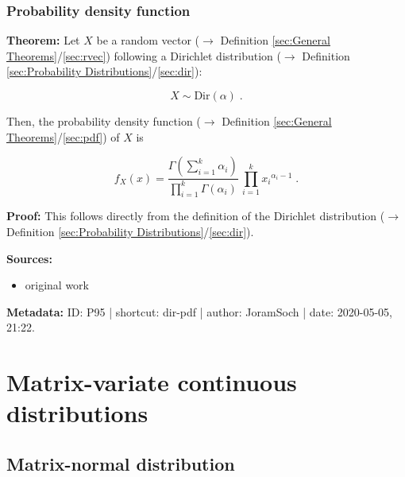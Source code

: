 \documentclass[a4paper,12pt,twoside]{book}
\begin{document}
\subsubsection[\textbf{Probability density function}]{Probability density function} \label{sec:dir-pdf}
\setcounter{equation}{0}

\textbf{Theorem:} Let $X$ be a random vector ($\rightarrow$ Definition \ref{sec:General Theorems}/\ref{sec:rvec}) following a Dirichlet distribution ($\rightarrow$ Definition \ref{sec:Probability Distributions}/\ref{sec:dir}):

\begin{equation} \label{eq:dir-pdf-Dir}
X \sim \mathrm{Dir}(\alpha) \; .
\end{equation}

Then, the probability density function ($\rightarrow$ Definition \ref{sec:General Theorems}/\ref{sec:pdf}) of $X$ is

\begin{equation} \label{eq:dir-pdf-Dir-pdf}
f_X(x) = \frac{\Gamma\left( \sum_{i=1}^k \alpha_i \right)}{\prod_{i=1}^k \Gamma(\alpha_i)} \, \prod_{i=1}^k {x_i}^{\alpha_i-1} \; .
\end{equation}


\vspace{1em}
\textbf{Proof:} This follows directly from the definition of the Dirichlet distribution ($\rightarrow$ Definition \ref{sec:Probability Distributions}/\ref{sec:dir}).


\vspace{1em}
\textbf{Sources:}
\begin{itemize}
\item original work\end{itemize}


\vspace{1em}
\textbf{Metadata:} ID: P95 | shortcut: dir-pdf | author: JoramSoch | date: 2020-05-05, 21:22.
\vspace{1em}



\pagebreak
\section{Matrix-variate continuous distributions}

\subsection{Matrix-normal distribution}
\end{document}
